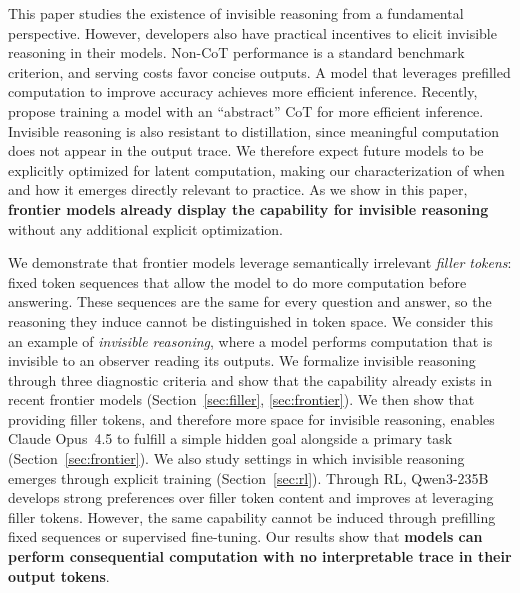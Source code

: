 \documentclass{article}
\begin{document}

This paper studies the existence of invisible reasoning from a fundamental perspective. However, developers also have practical incentives to elicit invisible reasoning in their models. Non-CoT performance is a standard benchmark criterion, and serving costs favor concise outputs. A model that leverages prefilled computation to improve accuracy achieves more efficient inference. Recently, \citet{ramji2026thinkingwordsefficientlatent} propose training a model with an ``abstract'' CoT for more efficient inference. Invisible reasoning is also resistant to distillation, since meaningful computation does not appear in the output trace. We therefore expect future models to be explicitly optimized for latent computation, making our characterization of when and how it emerges directly relevant to practice. As we show in this paper, \textbf{frontier models already display the capability for invisible reasoning} without any additional explicit optimization.

We demonstrate that frontier models leverage semantically irrelevant \textit{filler tokens}: fixed token sequences that allow the model to do more computation before answering. These sequences are the same for every question and answer, so the reasoning they induce cannot be distinguished in token space. %
We consider this an example of \emph{invisible reasoning}, where a model performs computation that is invisible to an observer reading its outputs. We formalize invisible reasoning through three diagnostic criteria and show that the capability already exists in recent frontier models (Section~\ref{sec:filler}, \ref{sec:frontier}).
We then show that providing filler tokens, and therefore more space for invisible reasoning, enables Claude Opus~4.5 to fulfill a simple hidden goal alongside a primary task 
(Section~\ref{sec:frontier}). 
We also study settings in which invisible reasoning emerges through explicit training (Section~\ref{sec:rl}). Through RL, Qwen3-235B develops strong preferences over filler token content and improves at leveraging filler tokens. However, the same capability cannot be induced through prefilling fixed sequences or supervised fine-tuning. Our results show that \textbf{models can perform consequential computation with no interpretable trace in their output tokens}.
\end{document}
